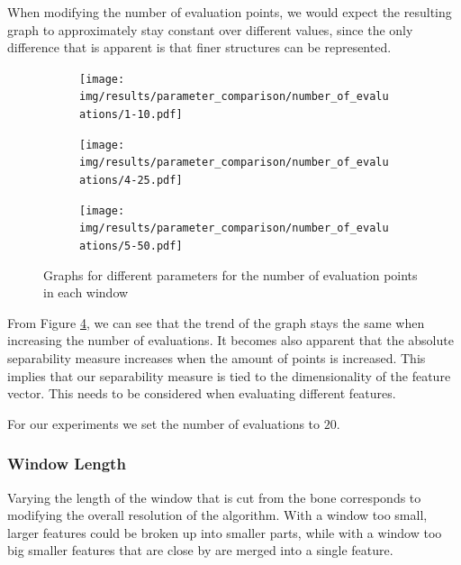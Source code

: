 \documentclass[pdftex,12pt,a4paper]{report}
\begin{document}
When modifying the number of evaluation points, we would expect the resulting graph to approximately stay constant over different values, since the only difference that is apparent is that finer structures can be represented.

\begin{figure}[h]
	\centering
	\begin{subfigure}[b]{0.32\textwidth}
		\centering
		\texttt{[image: img/results/parameter\_comparison/number\_of\_evaluations/1-10.pdf]}
		\label{fig:number-evaluations-0}
	\end{subfigure}
	\begin{subfigure}[b]{0.32\textwidth}
		\centering
		\texttt{[image: img/results/parameter\_comparison/number\_of\_evaluations/4-25.pdf]}
		\label{fig:number-evaluations-1}
	\end{subfigure}
	\begin{subfigure}[b]{0.32\textwidth}
		\centering
		\texttt{[image: img/results/parameter\_comparison/number\_of\_evaluations/5-50.pdf]}
		\label{fig:number-evaluations-2}
	\end{subfigure}
	\caption{Graphs for different parameters for the number of evaluation points in each window}
	\label{fig:number-evaluations}
\end{figure}

From Figure \ref{fig:number-evaluations}, we can see that the trend of the graph stays the same when increasing the number of evaluations. It becomes also apparent that the absolute separability measure increases when the amount of points is increased. This implies that our separability measure is tied to the dimensionality of the feature vector. This needs to be considered when evaluating different features.

For our experiments we set the number of evaluations to $20$.

\subsubsection{Window Length}

Varying the length of the window that is cut from the bone corresponds to modifying the overall resolution of the algorithm. With a window too small, larger features could be broken up into smaller parts, while with a window too big smaller features that are close by are merged into a single feature.
\end{document}
